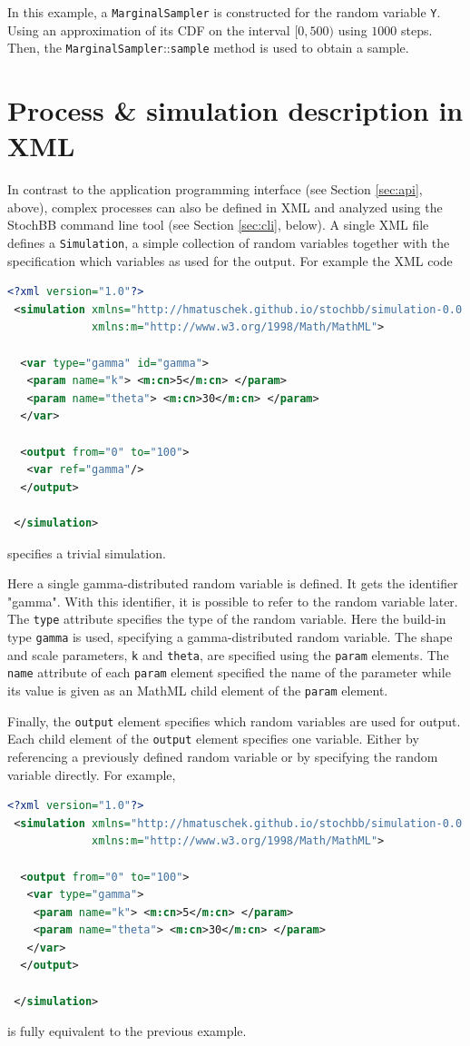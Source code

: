 \documentclass[a4paper, 10pt]{paper}
\newcommand{\code}[1]{\texttt{#1}}
\newcommand{\class}[1]{\code{#1}}
\newcommand{\method}[2]{\code{#1}::\code{#2}}
\begin{document}
In this example, a \class{MarginalSampler} is constructed for the random variable \code{Y}. Using an
approximation of its CDF on the interval $[0,500)$ using $1000$ steps. Then, the
\method{MarginalSampler}{sample} method is used to obtain a sample.


\section{Process \& simulation description in XML} \label{sec:xml}
In contrast to the application programming interface (see Section \ref{sec:api}, above), 
complex processes can also be defined in XML and analyzed using the
StochBB command line tool (see Section \ref{sec:cli}, below). A single XML file defines a 
\class{Simulation}, a simple collection of random variables together with the specification which
variables as used for the output. For example the XML code
\begin{lstlisting}[language=XML]
 <?xml version="1.0"?>
 <simulation xmlns="http://hmatuschek.github.io/stochbb/simulation-0.0.dtd"
             xmlns:m="http://www.w3.org/1998/Math/MathML">

  <var type="gamma" id="gamma">
   <param name="k"> <m:cn>5</m:cn> </param>
   <param name="theta"> <m:cn>30</m:cn> </param>
  </var>

  <output from="0" to="100">
   <var ref="gamma"/>
  </output>

 </simulation>
\end{lstlisting}
specifies a trivial simulation.

Here a single gamma-distributed random variable is defined.
It gets the identifier "gamma". With this identifier, it is possible to refer to the random
variable later. The \code{type} attribute specifies the type of the random variable. Here the
build-in type \code{gamma} is used, specifying a gamma-distributed random variable. The shape and
scale parameters, \code{k} and \code{theta}, are specified using the \code{param} elements. 
The \code{name} attribute of each \code{param} element specified the name of the parameter while 
its value is given as an MathML child element of the \code{param} element.

Finally, the \code{output} element specifies which random variables are used for output. Each child
element of the \code{output} element specifies one variable. Either by referencing a previously defined
random variable or by specifying the random variable directly. For example,
\begin{lstlisting}[language=XML]
 <?xml version="1.0"?>
 <simulation xmlns="http://hmatuschek.github.io/stochbb/simulation-0.0.dtd"
             xmlns:m="http://www.w3.org/1998/Math/MathML">

  <output from="0" to="100">
   <var type="gamma">
    <param name="k"> <m:cn>5</m:cn> </param>
    <param name="theta"> <m:cn>30</m:cn> </param>
   </var>
  </output>

 </simulation>
\end{lstlisting}
is fully equivalent to the previous example.
\end{document}
